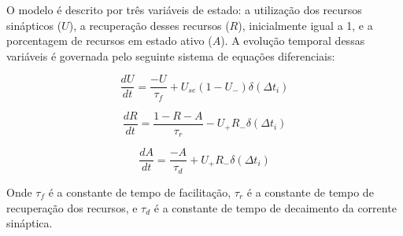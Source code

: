 \cite{moradiNormalized2022} %

O modelo é descrito por três variáveis de estado: a utilização dos recursos sinápticos ($U$), a recuperação desses recursos ($R$),
inicialmente igual a 1, e a porcentagem de recursos em estado ativo ($A$). A evolução temporal dessas
variáveis é governada pelo seguinte sistema de equações diferenciais:

\begin{equation}
    \label{eq_tsodyks_dU}
    \frac{dU}{dt} = \frac{-U}{\tau_f} + U_{se}(1-U_{-}) \delta(\Delta t_i)
\end{equation}

\begin{equation}
    \label{eq_tsodyks_dR}
    \frac{dR}{dt} = \frac{1-R-A}{\tau_r} - U_{+} R_{-} \delta(\Delta t_i)
\end{equation}

\begin{equation}
    \label{eq_tsodyks_dA}
    \frac{dA}{dt} = \frac{-A}{\tau_d} + U_{+} R_{-} \delta(\Delta t_i)
\end{equation}

Onde $\tau_f$ é a constante de tempo de facilitação, $\tau_r$ é a constante de tempo de recuperação dos recursos, e $\tau_d$
é a constante de tempo de decaimento da corrente sináptica.







